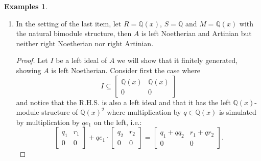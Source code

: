 \documentclass{tufte-handout} %
\newtheorem{prop}[thm]{Proposition}
\theoremstyle{definition}
\newtheorem{exmps}[thm]{Examples}
\theoremstyle{remark}
\newcommand{\Q}{\mathbb{Q}}
\begin{document}
\begin{exmps}
\begin{enumerate}
		Observe that the subset $Me_2$ is a two-sided ideal of $A$ because
		\[\begin{bmatrix}
		r_1&m_1\\0&s_1\end{bmatrix}\begin{bmatrix}
		0&m\\0&0\end{bmatrix} = \begin{bmatrix}
		0&r_1m\\0&0\end{bmatrix} \text{ and } \begin{bmatrix}
		0&m\\0&0\end{bmatrix}\begin{bmatrix}
		r_2&m_2\\0&s_2\end{bmatrix} = \begin{bmatrix}
		0&ms_2\\0&0\end{bmatrix}.\]
		Moreover, we have a clear isomorphism $A/Me_2 \cong R \times S$.
		
		\begin{prop}
			If $R$ and $S$ are left Artinian, then $A$ is left Artinian if and only if $M$ is finitely generated over $R$.
		\end{prop}
		
		
		\item In the setting of the last item, let $R = \Q(x)$, $S = \Q$ and $M= \Q(x)$ with the natural bimodule structure, then $A$ is left Noetherian and Artinian but neither right Noetherian nor right Artinian.
		\begin{proof}
			Let $I$ be a left ideal of $A$ we will show that it finitely generated, showing $A$ is left Noetherian. Consider first the case where 
			\[I \subseteq \begin{bmatrix}\Q(x)&\Q(x)\\0&0\end{bmatrix}\]
			and notice that the R.H.S. is also a left ideal and that it has the left $\Q(x)$-module structure of $\Q(x)^2$ where multiplication by $q \in \Q(x)$ is simulated by multiplication by $qe_1$ on the left, i.e.:
			\[\begin{bmatrix}q_1&r_1\\0&0\end{bmatrix}+qe_1\cdot\begin{bmatrix}q_2&r_2\\0&0\end{bmatrix} = \begin{bmatrix}q_1+qq_2&r_1+qr_2\\0&0\end{bmatrix}.\]
			

\end{proof}
\end{enumerate}
\end{exmps}
\end{document}
